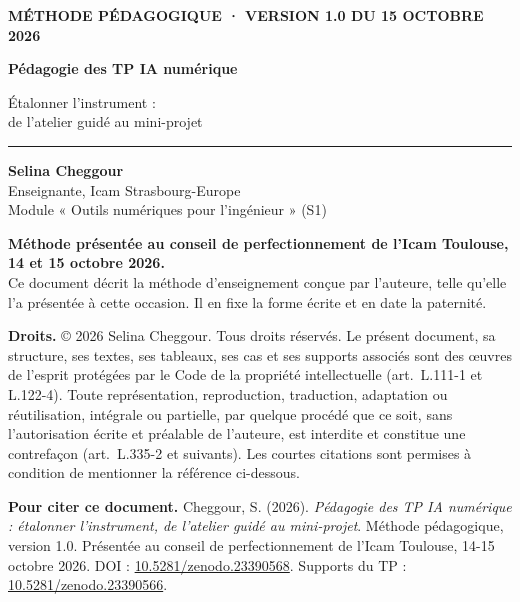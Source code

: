 \documentclass[11pt,a4paper]{article}
\newcommand{\auteure}{Selina Cheggour}
\newcommand{\presente}{Méthode présentée au conseil de perfectionnement de l'Icam Toulouse, 14 et 15 octobre 2026}
\begin{document}
\thispagestyle{plain}
\begin{tcolorbox}[enhanced,colback=white,colframe=white,boxrule=0pt,arc=0pt,left=0pt,right=0pt,
  borderline west={4pt}{0pt}{icamorange}]
\hspace{6mm}\begin{minipage}{0.92\linewidth}
{\scriptsize\bfseries\color{icamred}MÉTHODE PÉDAGOGIQUE · VERSION 1.0 DU 15 OCTOBRE 2026}\par\vspace{4mm}
{\selectfont\fontsize{26}{31}\selectfont\bfseries Pédagogie des TP IA numérique\par}
\vspace{3mm}
{\large\color{icamgray}Étalonner l'instrument :\\ de l'atelier guidé au mini-projet\par}
\vspace{6mm}
{\color{icamorange}\rule{22mm}{1.5pt}}\par\vspace{3mm}
\textbf{\auteure}\\
Enseignante, Icam Strasbourg-Europe\\
Module « Outils numériques pour l'ingénieur » (S1)
\end{minipage}
\end{tcolorbox}

\vspace{6mm}
\begin{cadre}
\textbf{\presente.}\\[1mm]
Ce document décrit la méthode d'enseignement conçue par l'auteure, telle qu'elle l'a présentée
à cette occasion. Il en fixe la forme écrite et en date la paternité.
\end{cadre}

\vspace{2mm}
\begin{cadregris}
\small\textbf{Droits.} © 2026 \auteure. Tous droits réservés. Le présent document, sa
structure, ses textes, ses tableaux, ses cas et ses supports associés sont des œuvres de l'esprit
protégées par le Code de la propriété intellectuelle (art.~L.111-1 et L.122-4). Toute
représentation, reproduction, traduction, adaptation ou réutilisation, intégrale ou partielle,
par quelque procédé que ce soit, sans l'autorisation écrite et préalable de l'auteure, est
interdite et constitue une contrefaçon (art.~L.335-2 et suivants). Les courtes citations sont
permises à condition de mentionner la référence ci-dessous.

\medskip
\textbf{Pour citer ce document.} Cheggour, S. (2026). \emph{Pédagogie des TP IA numérique : étalonner l'instrument, de l'atelier guidé au mini-projet}. Méthode pédagogique,
version 1.0. Présentée au conseil de perfectionnement de l'Icam Toulouse, 14-15 octobre 2026.
DOI : \href{https://doi.org/10.5281/zenodo.23390568}{10.5281/zenodo.23390568}. Supports du TP :
\href{https://doi.org/10.5281/zenodo.23390566}{10.5281/zenodo.23390566}.
\end{cadregris}
\end{document}
